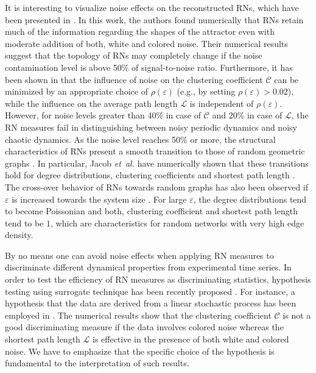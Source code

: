 		It is interesting to visualize noise effects on the reconstructed RNs, which have been presented in \cite{Jacob2016a}. In this work, the authors found numerically that RNs retain much of the information regarding the shapes of the attractor even with moderate addition of both, white and colored noise. Their numerical results suggest that the topology of RNs may completely change if the noise contamination level is above 50\% of signal-to-noise ratio. Furthermore, it has been shown in \cite{Subramaniyam2014} that the influence of noise on the clustering coefficient $\mathcal{C}$ can be minimized by an appropriate choice of $\rho(\varepsilon)$ (e.g., by setting $\rho(\varepsilon) > 0.02$), while the influence on the average path length $\mathcal{L}$ is independent of $\rho(\varepsilon)$. However, for noise levels greater than 40\% in case of $\mathcal{C}$ and 20\% in case of $\mathcal{L}$, the RN measures fail in distinguishing between noisy periodic dynamics and noisy chaotic dynamics. As the noise level reaches 50\% or more, the structural characteristics of RNs present a smooth transition to those of random geometric graphs \cite{Jacob2017}. In particular, Jacob {\textit {et~al.}} have numerically shown that these transitions hold for degree distributions, clustering coefficients and shortest path length \cite{Jacob2017}. The cross-over behavior of RNs towards random graphs has also been observed if $\varepsilon$ is increased towards the system size \cite{Jacob2017}. For large $\varepsilon$, the degree distributions tend to become Poissonian and both, clustering coefficient and shortest path length tend to be $1$, which are characteristics for random networks with very high edge density.

		By no means one can avoid noise effects when applying RN measures to discriminate different dynamical properties from experimental time series. In order to test the efficiency of RN measures as discriminating statistics, hypothesis testing using surrogate technique has been recently proposed \cite{Jacob2018}. For instance, a hypothesis that the data are derived from a linear stochastic process has been employed in \cite{Jacob2018}. The numerical results show that the clustering coefficient $\mathcal{C}$ is not a good discriminating measure if the data involves colored noise whereas the shortest path length $\mathcal{L}$ is effective in the presence of both white and colored noise. We have to emphasize that the specific choice of the hypothesis is fundamental to the interpretation of such results.

